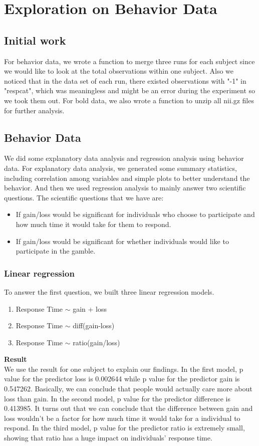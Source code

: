 \section{Exploration on Behavior Data}
\subsection{Initial work}
\noindent
For behavior data, we wrote a function to merge three runs for each subject 
since we would like to look at the total observations within one subject.
Also we noticed that in the data set of each run, there existed observations
with "-1" in "respcat", which was meaningless and might be an error during 
the experiment so we took them out. For bold data, we also wrote a function 
to unzip all nii.gz files for further analysis.

\subsection{Behavior Data}
\noindent
We did some explanatory data analysis and regression analysis using behavior 
data. For explanatory data analysis, we generated some summary statistics, 
including correlation among variables and simple plots to better understand 
the behavior. And then we used regression analysis to mainly answer two 
scientific questions. The scientific questions that we have are:
\begin{itemize}
\item If gain/loss would be significant for individuals who choose to 
participate and how much time it would take for them to respond.
\item If gain/loss would be significant for whether individuals would like to 
participate in the gamble. 
\end {itemize}

\subsubsection {Linear regression}
To answer the first question, we built three linear regression models.
\begin{enumerate}
\item  Response Time $\sim$ gain + loss
\item  Response Time $\sim$ diff(gain-loss)
\item  Response Time $\sim$ ratio(gain/loss)
\end {enumerate}
\textbf{Result} \\
We use the result for one subject to explain our findings. In the first model, 
p value for the predictor loss is 0.002644 while p value for the predictor gain 
is 0.547262. Basically, we can conclude that people would actually care more 
about loss than gain. In the second model, p value for the predictor difference
is 0.413985.  It turns out that we can conclude that the difference between gain 
and loss wouldn't be a factor for how much time it would take for a individual 
to respond. In the third model, p value for the predictor ratio is extremely 
small, showing that ratio has a huge impact on individuals' response time.

